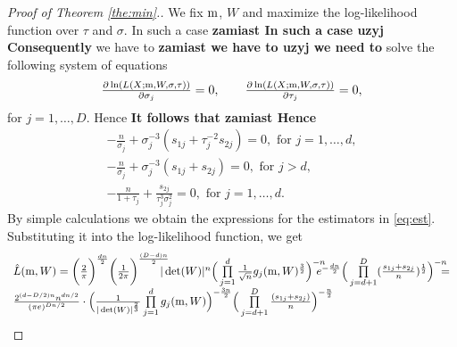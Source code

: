 \begin{proof}[Proof of Theorem \ref{the:min}.]
We fix  $\mathrm{m}$, $W$ and maximize the log-likelihood function over $\tau$ and $\sigma$.
In such a case \textbf{zamiast In such a case uzyj Consequently} we have to \textbf{zamiast we have to uzyj we need to} solve the following system of equations
$$
\begin{array}{l}
\frac{\partial  \ln ( L(X;\m,W,\sigma,\tau) ) }{\partial \sigma_j} =0, \qquad %
 \frac{\partial  \ln ( L(X;\m,W,\sigma,\tau) ) }{\partial \tau_j} =0 , %
\end{array}
$$
for  $ j=1,\ldots,D$. Hence \textbf{It follows that zamiast Hence}
$$
\begin{array}{l}
-\frac{n}{\sigma_j} +  \sigma_j^{-3} (s_{1j} + \tau_j^{-2} s_{2j} ) = 0, \mbox{ for }  j=1,\ldots,d,\\[6pt]
 -\frac{n}{\sigma_j} +  \sigma_j^{-3} (s_{1j} + s_{2j} ) =0, \mbox{ for } j>d, \\[6pt] %
- \frac{n}{1+\tau_j} + \frac{s_{2j}}{\tau_j^{3}\sigma_j^{2}} =0 , \mbox{ for } j=1,\ldots,d.
\end{array}
$$
By simple calculations we obtain the expressions for the estimators in \ref{eq:est}.
Substituting it into the log-likelihood function,
we get %
$$
\begin{array}{l}
\hat{L}(\m,W) = \bigg( \frac{2}{\pi} \bigg)^{\frac{dn}{2}}  \bigg( \frac{1}{2\pi} \bigg)^{\frac{(D-d)n}{2}} \!\!\!\!\! |\det(W)|^{n} \Big( \prod\limits_{j=1}^{d} \frac{1}{\sqrt{n}} g_j(\m,W)^{\frac{3}{2}} \Big)^{-n} \!\!\!\!\!
e^{-\frac{dn}{2}} \Big( \prod\limits_{j=d+1}^{D} (\frac{s_{1j} + s_{2j}}{n})^{\frac{1}{2}} \Big)^{-n} \!\!\!\!\! = \\[6pt]
\frac{ 2^{(d-D/2)n} n^{dn/2} }{(\pi e)^{Dn/2}} \cdot %
\Big( \frac{1}{|\det(W)|^{\frac{2}{3}}} \prod\limits_{j=1}^{d} g_j(\m,W) \Big)^{-\frac{3n}{2}} \Big( \prod\limits_{j=d+1}^{D} \frac{(s_{1j} + s_{2j})}{n} \Big)^{-\frac{n}{2}} 
\end{array}
$$
\end{proof}
